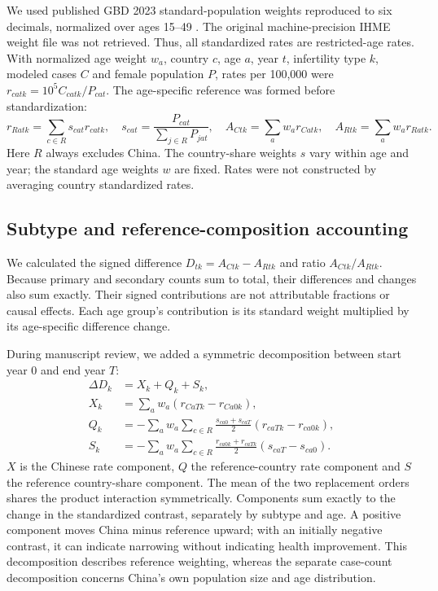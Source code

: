 \documentclass[11pt,a4paper]{article}
\begin{document}
We used published GBD 2023 standard-population weights reproduced to six decimals, normalized over ages 15--49 \cite{chen}. The original machine-precision IHME weight file was not retrieved. Thus, all standardized rates are restricted-age rates. With normalized age weight $w_a$, country $c$, age $a$, year $t$, infertility type $k$, modeled cases $C$ and female population $P$, rates per 100,000 were $r_{catk}=10^5 C_{catk}/P_{cat}$. The age-specific reference was formed before standardization:
\begin{equation}
 r_{Ratk}=\sum_{c\in R}s_{cat}r_{catk},\quad
 s_{cat}=\frac{P_{cat}}{\sum_{j\in R}P_{jat}},\quad
 A_{Ctk}=\sum_a w_a r_{Catk},\quad A_{Rtk}=\sum_a w_a r_{Ratk}.
\end{equation}
Here $R$ always excludes China. The country-share weights $s$ vary within age and year; the standard age weights $w$ are fixed. Rates were not constructed by averaging country standardized rates.

\subsection{Subtype and reference-composition accounting}
We calculated the signed difference $D_{tk}=A_{Ctk}-A_{Rtk}$ and ratio $A_{Ctk}/A_{Rtk}$. Because primary and secondary counts sum to total, their differences and changes also sum exactly. Their signed contributions are not attributable fractions or causal effects. Each age group's contribution is its standard weight multiplied by its age-specific difference change.

During manuscript review, we added a symmetric decomposition between start year 0 and end year $T$:
\begin{align}
 \Delta D_k &= X_k+Q_k+S_k,\\
 X_k &=\sum_a w_a(r_{CaTk}-r_{Ca0k}),\\
 Q_k &=-\sum_a w_a\sum_{c\in R}\frac{s_{ca0}+s_{caT}}{2}(r_{caTk}-r_{ca0k}),\\
 S_k &=-\sum_a w_a\sum_{c\in R}\frac{r_{ca0k}+r_{caTk}}{2}(s_{caT}-s_{ca0}).
\end{align}
$X$ is the Chinese rate component, $Q$ the reference-country rate component and $S$ the reference country-share component. The mean of the two replacement orders shares the product interaction symmetrically. Components sum exactly to the change in the standardized contrast, separately by subtype and age. A positive component moves China minus reference upward; with an initially negative contrast, it can indicate narrowing without indicating health improvement. This decomposition describes reference weighting, whereas the separate case-count decomposition concerns China's own population size and age distribution.
\end{document}
